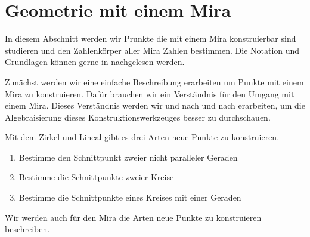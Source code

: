 \chapter{Geometrie mit einem Mira}

In diesem Abschnitt werden wir Prunkte die mit einem Mira konstruierbar sind studieren und den Zahlenkörper aller Mira Zahlen bestimmen.
Die Notation und Grundlagen können gerne in \cite{Vogel} nachgelesen werden.


Zunächst werden wir eine einfache Beschreibung erarbeiten um Punkte mit einem Mira zu konstruieren. Dafür brauchen wir ein Verständnis für den Umgang mit einem Mira. Dieses Verständnis werden wir und nach und nach erarbeiten, um die Algebraisierung dieses Konstruktionswerkzeuges besser zu durchschauen. 

\begin{remark}
    Mit dem Zirkel und Lineal gibt es drei Arten neue Punkte zu konstruieren.
    \begin{enumerate}[label=\textup{(}\arabic*.\textup{)}]
        \item Bestimme den Schnittpunkt zweier nicht paralleler Geraden
        \item Bestimme die Schnittpunkte zweier Kreise
        \item Bestimme die Schnittpunkte eines Kreises mit einer Geraden
    \end{enumerate}
    Wir werden auch für den Mira die Arten neue Punkte zu konstruieren beschreiben.
\end{remark}

